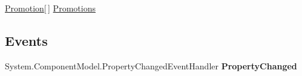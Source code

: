 \begin{DoxyCompactItemize}
\begin{DoxyCompactList}\small\item\em \end{DoxyCompactList}\item 
\hypertarget{class_price___comparison_1_1amazon_1_1ecs_1_1_offer_ae65a4c57eb55f5f0f1a8bee5e27394cc}{\hyperlink{class_price___comparison_1_1amazon_1_1ecs_1_1_promotion}{Promotion}\mbox{[}$\,$\mbox{]} \hyperlink{class_price___comparison_1_1amazon_1_1ecs_1_1_offer_ae65a4c57eb55f5f0f1a8bee5e27394cc}{Promotions}}\label{class_price___comparison_1_1amazon_1_1ecs_1_1_offer_ae65a4c57eb55f5f0f1a8bee5e27394cc}

\begin{DoxyCompactList}\small\item\em \end{DoxyCompactList}\end{DoxyCompactItemize}
\subsection*{Events}
\begin{DoxyCompactItemize}
\item 
\hypertarget{class_price___comparison_1_1amazon_1_1ecs_1_1_offer_aba2f71342eb35e74144d557c2cee994b}{System.\-Component\-Model.\-Property\-Changed\-Event\-Handler {\bfseries Property\-Changed}}\label{class_price___comparison_1_1amazon_1_1ecs_1_1_offer_aba2f71342eb35e74144d557c2cee994b}

\end{DoxyCompactItemize}
